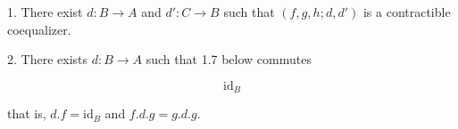 1. There exist $d:B \longrightarrow A$ and $d':C \longrightarrow B$ such that $(f, g, h; d, d')$ is a contractible coequalizer.

2. There exists $d:B \longrightarrow A$ such that 1.7 below commutes

$$\text{id}_B$$

that is, $d.f = \text{id}_B$ and $f.d.g = g.d.g$.